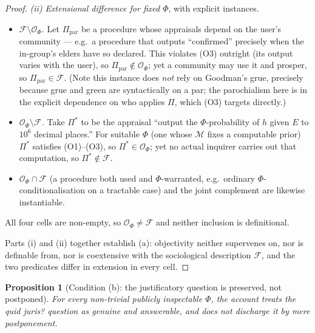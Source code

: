 \documentclass{amsart}
\theoremstyle{definition}
\theoremstyle{plain}
\newtheorem{proposition}{Proposition}
\theoremstyle{remark}
\begin{document}
\begin{proof}
\emph{(ii) Extensional difference for fixed $\Phi$}, with explicit instances.
\begin{itemize}
\item \emph{$\mathcal{F}\setminus\mathcal{O}_\Phi$.} Let $\Pi_{\text{par}}$ be a
procedure whose appraisals depend on the user's community --- e.g.\ a procedure
that outputs ``confirmed'' precisely when the in-group's elders have so
declared. This violates (O3) outright (its output varies with the user), so
$\Pi_{\text{par}}\notin\mathcal{O}_\Phi$; yet a community may use it and
prosper, so $\Pi_{\text{par}}\in\mathcal{F}$. (Note this instance does
\emph{not} rely on Goodman's grue, precisely because grue and green are
syntactically on a par; the parochialism here is in the explicit dependence on
who applies $\Pi$, which (O3) targets directly.)
\item \emph{$\mathcal{O}_\Phi\setminus\mathcal{F}$.} Take $\Pi^\ast$ to be the
appraisal ``output the $\Phi$-probability of $h$ given $E$ to $10^{6}$ decimal
places.'' For suitable $\Phi$ (one whose $\mathcal{M}$ fixes a computable prior)
$\Pi^\ast$ satisfies (O1)--(O3), so $\Pi^\ast\in\mathcal{O}_\Phi$; yet no actual
inquirer carries out that computation, so $\Pi^\ast\notin\mathcal{F}$.
\item \emph{$\mathcal{O}_\Phi\cap\mathcal{F}$} (a procedure both used and
$\Phi$-warranted, e.g.\ ordinary $\Phi$-conditionalisation on a tractable case)
and the joint complement are likewise instantiable.
\end{itemize}
All four cells are non-empty, so $\mathcal{O}_\Phi\neq\mathcal{F}$ and neither
inclusion is definitional.

Parts (i) and (ii) together establish (a): objectivity neither supervenes on,
nor is definable from, nor is coextensive with the sociological description
$\mathcal{F}$, and the two predicates differ in extension in every cell.
\end{proof}

\begin{proposition}[Condition (b): the justificatory question is preserved,
not postponed]\label{prop:b}
For every non-trivial publicly inspectable $\Phi$, the account treats the quid
juris? question as genuine and answerable, and does not discharge it by mere
postponement.
\end{proposition}
\end{document}
